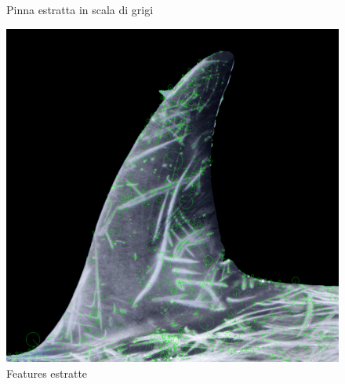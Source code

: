 \documentclass[a4paper,12pt]{report}
\begin{document}
\begin{figure}[H]
\begin{minipage}{0.3\textwidth}
        \caption{Pinna estratta in scala di grigi}
      \end{minipage}
      \begin{minipage}{0.3\textwidth}
        \centering
        \includegraphics[width=\textwidth]{assets/images/methods/porting/features_extraction/features.png}   
        \caption{Features estratte}
      \end{minipage}
    \end{figure}
\end{document}

